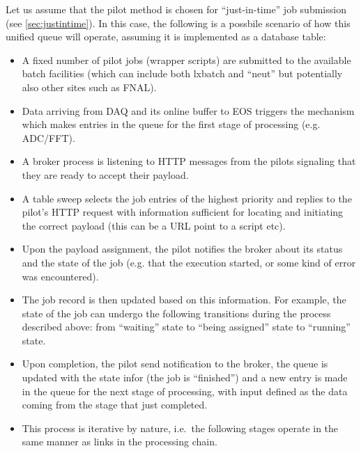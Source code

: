 \documentclass[pdftex,12pt,letter]{article}
\begin{document}
Let us assume that the pilot method is chosen for ``just-in-time'' job submission (see \ref{sec:justintime}). In this
case, the following is a possbile scenario of how this unified queue will operate, assuming it is implemented
as a database table:
\begin{itemize}

\item A fixed number of pilot jobs (wrapper scripts) are submitted to the available batch facilities (which can include both
lxbatch and ``neut'' but potentially also other sites such as FNAL).

\item Data arriving from DAQ and its online buffer to EOS triggers the mechanism which makes entries in the queue for the
first stage of processing (e.g. ADC/FFT).

\item A broker process is listening to HTTP messages from the pilots signaling that they are ready to accept their payload.

\item A table sweep selects the job entries of the highest priority and replies to the pilot's HTTP request with information
sufficient for locating and initiating the correct payload (this can be a URL point to a script etc).

\item Upon the payload assignment, the pilot notifies the broker about its status and the state of the job (e.g.
that the execution started, or some kind of error was encountered).

\item The job record is then updated based on this information. For example, the state of the job can undergo the following
transitions  during the process described above: from ``waiting'' state to ``being assigned'' state to ``running'' state.

\item Upon completion, the pilot send notification to the broker, the queue is updated with the state infor (the job is ``finished'') and
a new entry is made in the queue for the next stage of processing, with input defined as the data coming from the stage that just completed.

\item This process is iterative by nature, i.e.~the following stages operate in the same manner as links in the processing chain.

\end{itemize}
\end{document}
